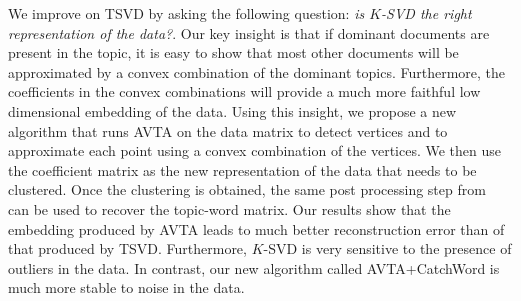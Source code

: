 \documentclass[]{article}
\begin{document}
	We improve on TSVD by asking the following question: {\it is $K$-SVD the right representation of the data?}. Our key insight is that if dominant documents are present in the topic, it is easy to show that most other documents will be approximated by a convex combination of the dominant topics. Furthermore, the coefficients in the convex combinations will provide a much more faithful low dimensional embedding of the data. Using this insight, we propose a new algorithm that runs AVTA on the data matrix to detect vertices and to approximate each point using a convex combination of the vertices. We then use the coefficient matrix as the new representation of the data that needs to be clustered. Once the clustering is obtained, the same post processing step from~\cite{bansal2014provable} can be used to recover the topic-word matrix. Our results show that the embedding produced by AVTA leads to much better reconstruction error than of that produced by TSVD. Furthermore, $K$-SVD is very sensitive to the presence of outliers in the data. In contrast, our new algorithm called AVTA+CatchWord is much more stable to noise in the data.
\end{document}
